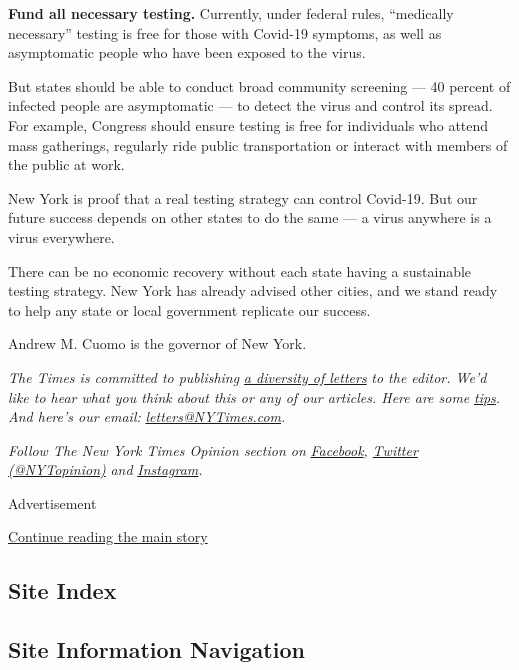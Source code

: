 \textbf{Fund all necessary testing.} Currently, under federal rules,
``medically necessary'' testing is free for those with Covid-19
symptoms, as well as asymptomatic people who have been exposed to the
virus.

But states should be able to conduct broad community screening --- 40
percent of infected people are asymptomatic --- to detect the virus and
control its spread. For example, Congress should ensure testing is free
for individuals who attend mass gatherings, regularly ride public
transportation or interact with members of the public at work.

New York is proof that a real testing strategy can control Covid-19. But
our future success depends on other states to do the same --- a virus
anywhere is a virus everywhere.

There can be no economic recovery without each state having a
sustainable testing strategy. New York has already advised other cities,
and we stand ready to help any state or local government replicate our
success.

Andrew M. Cuomo is the governor of New York.

\emph{The Times is committed to publishing}
\href{https://www.nytimes3xbfgragh.onion/2019/01/31/opinion/letters/letters-to-editor-new-york-times-women.html}{\emph{a
diversity of letters}} \emph{to the editor. We'd like to hear what you
think about this or any of our articles. Here are some}
\href{https://help.nytimes3xbfgragh.onion/hc/en-us/articles/115014925288-How-to-submit-a-letter-to-the-editor}{\emph{tips}}\emph{.
And here's our email:}
\href{mailto:letters@NYTimes.com}{\emph{letters@NYTimes.com}}\emph{.}

\emph{Follow The New York Times Opinion section on}
\href{https://www.facebookcorewwwi.onion/nytopinion}{\emph{Facebook}}\emph{,}
\href{http://twitter.com/NYTOpinion}{\emph{Twitter (@NYTopinion)}}
\emph{and}
\href{https://www.instagram.com/nytopinion/}{\emph{Instagram}}\emph{.}

Advertisement

\protect\hyperlink{after-bottom}{Continue reading the main story}

\hypertarget{site-index}{%
\subsection{Site Index}\label{site-index}}

\hypertarget{site-information-navigation}{%
\subsection{Site Information
Navigation}\label{site-information-navigation}}

